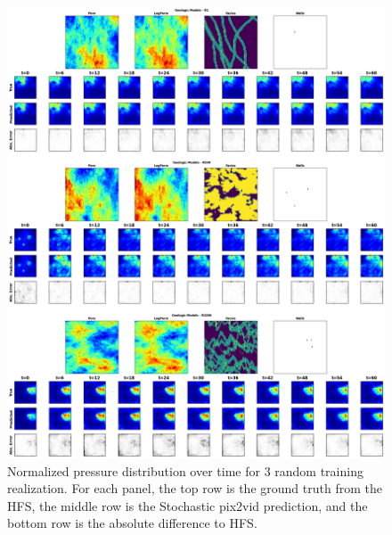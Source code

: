 \documentclass[10pt, twoside]{article}
\begin{document}
\begin{figure}
    \centering
    \includegraphics[width=\textwidth,height=0.95\textheight,keepaspectratio]{figures/train_pres.png}
    \caption{Normalized pressure distribution over time for 3 random training realization. For each panel, the top row is the ground truth from the HFS, the middle row is the Stochastic pix2vid prediction, and the bottom row is the absolute difference to HFS.}
    \label{train_pres}
\end{figure}
\end{document}
